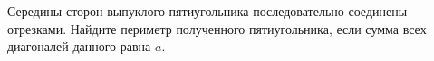 \begin{ex}
	\begin{condition}
		Середины сторон выпуклого пятиугольника последовательно соединены отрезками. Найдите периметр полученного пятиугольника, если сумма всех диагоналей данного равна \( a \).
	\end{condition}
\end{ex}